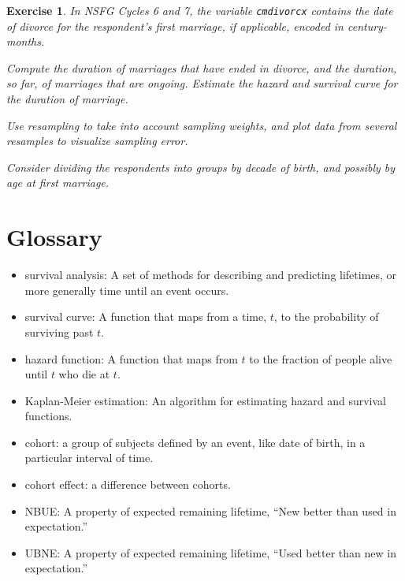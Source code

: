 \documentclass[12pt]{book}
\theoremstyle{exercise}
\newtheorem{exercise}{Exercise}[chapter]
\begin{document}
\begin{exercise}
In NSFG Cycles 6 and 7, the variable {\tt cmdivorcx} contains the
date of divorce for the respondent's first marriage, if applicable,
encoded in century-months.%
%

Compute the duration of marriages that have ended in divorce, and
the duration, so far, of marriages that are ongoing.  Estimate the
hazard and survival curve for the duration of marriage.

Use resampling to take into account sampling weights, and plot
data from several resamples to visualize sampling error.%

Consider dividing the respondents into groups by decade of birth,
and possibly by age at first marriage.%

\end{exercise}


\section{Glossary}

\begin{itemize}

\item survival analysis: A set of methods for describing and
  predicting lifetimes, or more generally time until an event occurs.%

\item survival curve: A function that maps from a time, $t$, to the
  probability of surviving past $t$.%

\item hazard function: A function that maps from $t$ to the fraction
of people alive until $t$ who die at $t$.%

\item Kaplan-Meier estimation: An algorithm for estimating hazard and
survival functions.%

\item cohort: a group of subjects defined by an event, like date of
birth, in a particular interval of time.%

\item cohort effect: a difference between cohorts.%

\item NBUE: A property of expected remaining lifetime, ``New
better than used in expectation.''%

\item UBNE: A property of expected remaining lifetime, ``Used
better than new in expectation.''%

\end{itemize}
\end{document}
